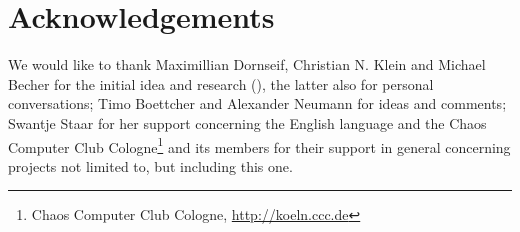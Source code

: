%
%

\section{Acknowledgements}

We would like to thank Maximillian Dornseif, Christian N. Klein and Michael
Becher for the initial idea and research (\cite{cansecwest_firewire:2005}), the
latter also for personal conversations; Timo Boettcher and Alexander Neumann for
ideas and comments; Swantje Staar for her support concerning the English
language and the Chaos Computer Club Cologne\footnote{Chaos Computer Club
Cologne, \href{http://koeln.ccc.de}{http://koeln.ccc.de}} and its members for
their support in general concerning projects not limited to, but including this
one.

